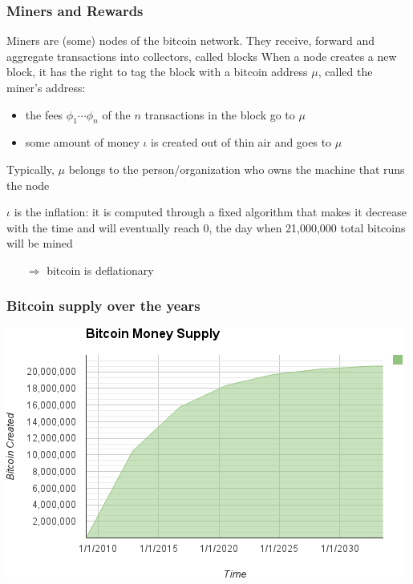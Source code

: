 \documentclass[11pt]{beamer}  %
\begin{document}
\begin{frame}\frametitle{Miners and Rewards}

  \begin{greenbox}{Miners are (some) nodes of the bitcoin network. They receive, forward
      and aggregate transactions into collectors, called \alert{blocks}}
    When a node creates a new block, it has the right to tag the block
    with a bitcoin address $\mu$, called the \alert{miner}'s address:
    \begin{itemize}
    \item the fees $\phi_1\cdots\phi_n$ of the $n$ transactions in the block go to $\mu$
    \item some amount of money $\iota$ is created out of thin air and goes to $\mu$
    \end{itemize}
  \end{greenbox}

  \bigskip

  \begin{greenbox}{}
    Typically, $\mu$ belongs to the person/organization who owns the machine that runs the node
  \end{greenbox}

  \bigskip

  \begin{greenbox}{}
    $\iota$ is the \alert{inflation}: it is computed through a fixed algorithm that makes it decrease with the time
    and will eventually reach $0$, the day when 21,000,000 total bitcoins will be mined
    \begin{itemize}
    \item[$\Rightarrow$] bitcoin is deflationary
    \end{itemize}
  \end{greenbox}

\end{frame}

\begin{frame}\frametitle{Bitcoin supply over the years}

  \begin{center}
    \includegraphics[width=\textwidth,clip=false]{pictures/mbc2_1001.png}
  \end{center}

\end{frame}
\end{document}
